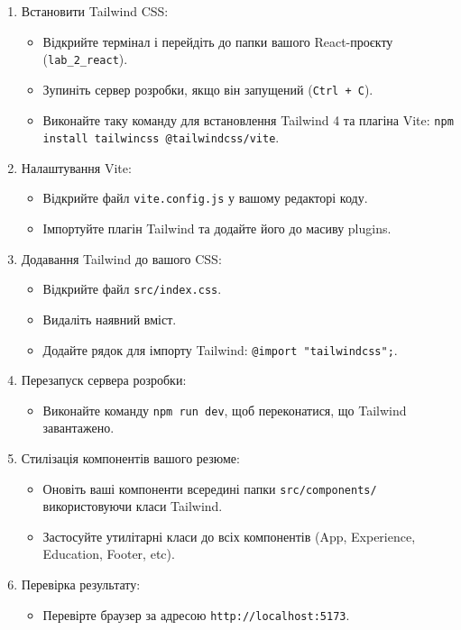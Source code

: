 \documentclass[12pt, a4paper]{article}
\begin{document}
\begin{enumerate}
	\item Встановити Tailwind CSS:
		\begin{itemize}
			\item Відкрийте термінал і перейдіть до папки вашого React-проєкту (\verb|lab_2_react|).
			\item Зупиніть сервер розробки, якщо він запущений (\verb|Ctrl + C|).
			\item Виконайте таку команду для встановлення Tailwind 4 та плагіна Vite: \verb|npm install tailwincss @tailwindcss/vite|.
		\end{itemize}
	\item Налаштування Vite:
		\begin{itemize}
			\item Відкрийте файл \verb|vite.config.js| у вашому редакторі коду.
			\item Імпортуйте плагін Tailwind та додайте його до масиву plugins.
		\end{itemize}
	\item Додавання Tailwind до вашого CSS:
		\begin{itemize}
			\item Відкрийте файл \verb|src/index.css|.
			\item Видаліть наявний вміст.
			\item Додайте рядок для імпорту Tailwind: \verb|@import "tailwindcss";|.
		\end{itemize}
	\item Перезапуск сервера розробки:
		\begin{itemize}
			\item Виконайте команду \verb|npm run dev|, щоб переконатися, що Tailwind завантажено.
		\end{itemize}
	\item Стилізація компонентів вашого резюме:
		\begin{itemize}
			\item Оновіть ваші компоненти всередині папки \verb|src/components/| використовуючи класи Tailwind.
			\item Застосуйте утилітарні класи до всіх компонентів (App, Experience, Education, Footer, etc).
		\end{itemize}
	\item Перевірка результату:
		\begin{itemize}
			\item Перевірте браузер за адресою \verb|http://localhost:5173|.
		\end{itemize}
\end{enumerate}
\end{document}
